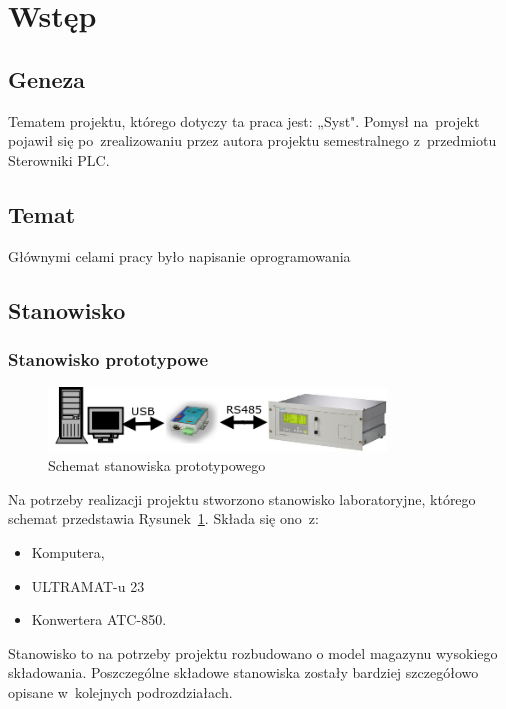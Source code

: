 \section{Wstęp}

\subsection{Geneza}
Tematem projektu, którego dotyczy ta praca jest: „Syst". Pomysł na~projekt pojawił się po~zrealizowaniu przez autora projektu semestralnego z~przedmiotu Sterowniki PLC.

\subsection{Temat}
Głównymi celami pracy było napisanie oprogramowania

\subsection{Stanowisko}
\subsubsection{Stanowisko prototypowe}
\begin{figure}[!htb] 	\centering 	\includegraphics[width=0.8\textwidth]{images/schemat1} 	\caption{Schemat stanowiska prototypowego} \label{schemat1} \end{figure} 
Na potrzeby realizacji projektu stworzono stanowisko laboratoryjne, którego schemat przedstawia Rysunek~\ref{schemat1}. Składa się ono~z:
\begin{itemize}
\item Komputera,
\item ULTRAMAT-u 23
\item Konwertera ATC-850.
\end{itemize}
\indent
\indent Stanowisko to na potrzeby projektu rozbudowano o model magazynu wysokiego składowania. Poszczególne składowe stanowiska zostały bardziej szczegółowo opisane w~kolejnych podrozdziałach.

